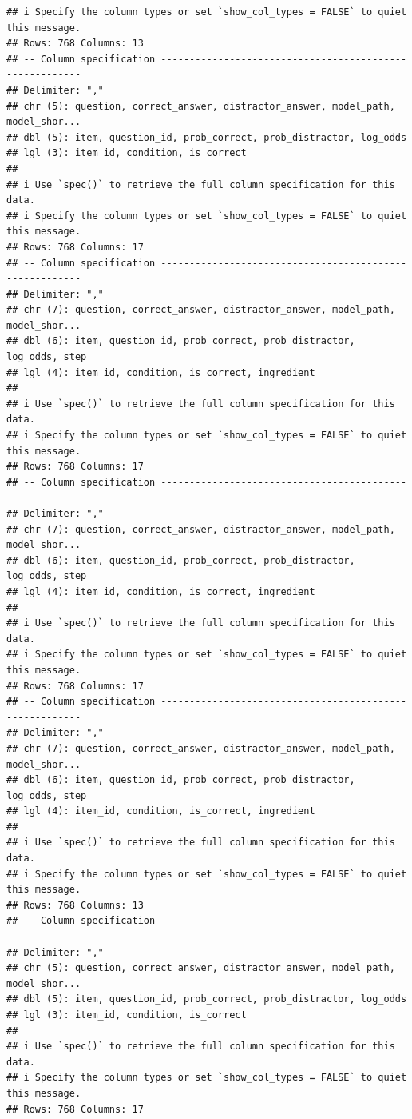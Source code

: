 \documentclass[
]{article}
\begin{document}
\begin{verbatim}
## i Specify the column types or set `show_col_types = FALSE` to quiet this message.
## Rows: 768 Columns: 13
## -- Column specification --------------------------------------------------------
## Delimiter: ","
## chr (5): question, correct_answer, distractor_answer, model_path, model_shor...
## dbl (5): item, question_id, prob_correct, prob_distractor, log_odds
## lgl (3): item_id, condition, is_correct
## 
## i Use `spec()` to retrieve the full column specification for this data.
## i Specify the column types or set `show_col_types = FALSE` to quiet this message.
## Rows: 768 Columns: 17
## -- Column specification --------------------------------------------------------
## Delimiter: ","
## chr (7): question, correct_answer, distractor_answer, model_path, model_shor...
## dbl (6): item, question_id, prob_correct, prob_distractor, log_odds, step
## lgl (4): item_id, condition, is_correct, ingredient
## 
## i Use `spec()` to retrieve the full column specification for this data.
## i Specify the column types or set `show_col_types = FALSE` to quiet this message.
## Rows: 768 Columns: 17
## -- Column specification --------------------------------------------------------
## Delimiter: ","
## chr (7): question, correct_answer, distractor_answer, model_path, model_shor...
## dbl (6): item, question_id, prob_correct, prob_distractor, log_odds, step
## lgl (4): item_id, condition, is_correct, ingredient
## 
## i Use `spec()` to retrieve the full column specification for this data.
## i Specify the column types or set `show_col_types = FALSE` to quiet this message.
## Rows: 768 Columns: 17
## -- Column specification --------------------------------------------------------
## Delimiter: ","
## chr (7): question, correct_answer, distractor_answer, model_path, model_shor...
## dbl (6): item, question_id, prob_correct, prob_distractor, log_odds, step
## lgl (4): item_id, condition, is_correct, ingredient
## 
## i Use `spec()` to retrieve the full column specification for this data.
## i Specify the column types or set `show_col_types = FALSE` to quiet this message.
## Rows: 768 Columns: 13
## -- Column specification --------------------------------------------------------
## Delimiter: ","
## chr (5): question, correct_answer, distractor_answer, model_path, model_shor...
## dbl (5): item, question_id, prob_correct, prob_distractor, log_odds
## lgl (3): item_id, condition, is_correct
## 
## i Use `spec()` to retrieve the full column specification for this data.
## i Specify the column types or set `show_col_types = FALSE` to quiet this message.
## Rows: 768 Columns: 17

\end{verbatim}
\end{document}
